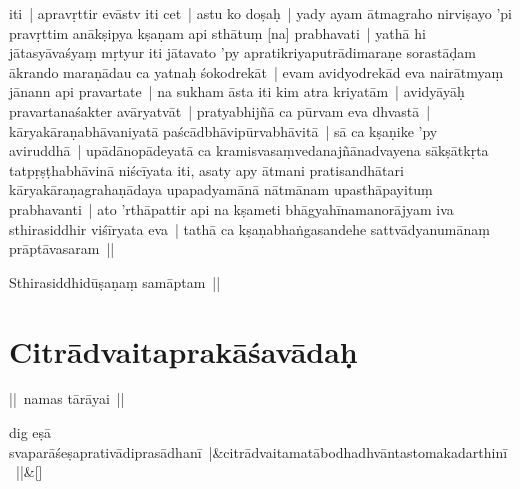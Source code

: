 \documentclass[article,12pt,a4paper]{memoir}%
\newcounter{parCount}
\begin{document}
	  
	  \pstart \leavevmode%
	iti | apravṛttir evāstv iti cet | \label{thakur75-127.29} astu ko doṣaḥ | yady ayam ātmagraho nirviṣayo 'pi pravṛttim anākṣipya kṣaṇam api sthātuṃ [na] prabhavati | yathā hi jātasyāvaśyaṃ mṛtyur iti jātavato 'py apratikriyaputrādimaraṇe sorastāḍam ākrando maraṇādau ca yatnaḥ śokodrekāt | evam avidyodrekād eva nairātmyaṃ jānann api pravartate | na sukham āsta iti kim atra kriyatām | avidyāyāḥ pravartanaśakter avāryatvāt | \label{thakur75-128.3} pratyabhijñā ca pūrvam eva dhvastā | kāryakāraṇabhāvaniyatā paścādbhāvipūrvabhāvitā | sā ca kṣaṇike 'py aviruddhā | upādānopādeyatā ca kramisvasaṃvedanajñānadvayena sākṣātkṛta tatpṛṣṭhabhāvinā niścīyata iti, \label{thakur75-128.6} asaty apy ātmani pratisandhātari kāryakāraṇagrahaṇādaya upapadyamānā nātmānam upasthāpayituṃ prabhavanti | ato 'rthāpattir api na kṣameti bhāgyahīnamanorājyam iva sthirasiddhir viśīryata eva | \label{thakur75-121.8} tathā ca kṣaṇabhaṅgasandehe sattvādyanumānaṃ prāptāvasaram ||
	{}
	\pend%
      

	  
	  \pstart \leavevmode%
	Sthirasiddhidūṣaṇaṃ samāptam || 
	{}
	\pend%
      
	    
	    \endnumbering%
	    
	  
	  
	
	    
	    \beginnumbering%
	    
	  
\chapter[{Citrādvaitaprakāśavādaḥ}][{Citrādvaitaprakāśavādaḥ}]{Citrādvaitaprakāśavādaḥ}\label{Citrādvaitaprakāśavādaḥ}

	  
	  \pstart \leavevmode%
	\label{thakur75-129.4}|| namas tārāyai || 
	{}
	\pend%
      
	    
	    \stanza[\smallbreak]
	  dig eṣā svaparāśeṣaprativādiprasādhanī |&citrādvaitamatābodhadhvāntastomakadarthinī ||\&[\smallbreak]
	  
	  
	  
\end{document}
